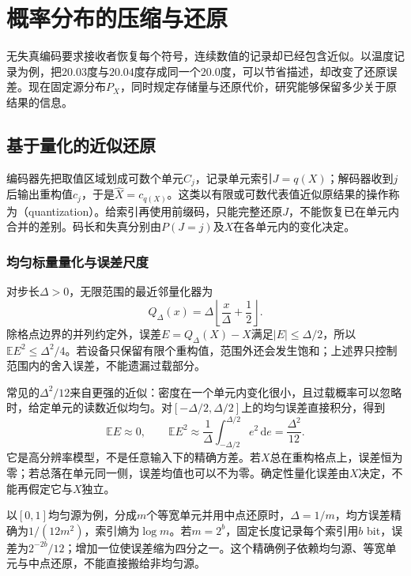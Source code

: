 \section{概率分布的压缩与还原}
\label{sec:information-compression-reconstruction}

无失真编码要求接收者恢复每个符号，连续数值的记录却已经包含近似。以温度记录为例，把\(20.03\)度与\(20.04\)度存成同一个\(20.0\)度，可以节省描述，却改变了还原误差。现在固定源分布\(P_X\)，同时规定存储量与还原代价，研究能够保留多少关于原结果的信息。

\subsection{基于量化的近似还原}
\label{sec:information-quantization}

编码器先把取值区域划成可数个单元\(C_j\)，记录单元索引\(J=q(X)\)；解码器收到\(j\)后输出重构值\(c_j\)，于是\(\widehat X=c_{q(X)}\)。这类以有限或可数代表值近似原结果的操作称为（quantization）。给索引再使用前缀码，只能完整还原\(J\)，不能恢复已在单元内合并的差别。码长和失真分别由\(P(J=j)\)及\(X\)在各单元内的变化决定。

\subsubsection{均匀标量量化与误差尺度}
对步长\(\Delta>0\)，无限范围的最近邻量化器为
\[
 Q_\Delta(x)=\Delta\left\lfloor\frac{x}{\Delta}+\frac12\right\rfloor.
\]
除格点边界的并列约定外，误差\(E=Q_\Delta(X)-X\)满足\(|E|\leq\Delta/2\)，所以\(\mathbb E E^2\leq\Delta^2/4\)。若设备只保留有限个重构值，范围外还会发生饱和；上述界只控制范围内的舍入误差，不能遗漏过载部分。

常见的\(\Delta^2/12\)来自更强的近似：密度在一个单元内变化很小，且过载概率可以忽略时，给定单元的读数近似均匀。对\([-\Delta/2,\Delta/2]\)上的均匀误差直接积分，得到
\[
 \mathbb E E\approx0,\qquad
 \mathbb E E^2\approx\frac1\Delta
 \int_{-\Delta/2}^{\Delta/2}e^2\,\mathrm de
 =\frac{\Delta^2}{12}.
\]
它是高分辨率模型，不是任意输入下的精确方差。若\(X\)总在重构格点上，误差恒为零；若总落在单元同一侧，误差均值也可以不为零。确定性量化误差由\(X\)决定，不能再假定它与\(X\)独立。

以\([0,1]\)均匀源为例，分成\(m\)个等宽单元并用中点还原时，\(\Delta=1/m\)，均方误差精确为\(1/(12m^2)\)，索引熵为\(\log m\)。若\(m=2^b\)，固定长度记录每个索引用\(b\) bit，误差为\(2^{-2b}/12\)；增加一位使误差缩为四分之一。这个精确例子依赖均匀源、等宽单元与中点还原，不能直接搬给非均匀源。

